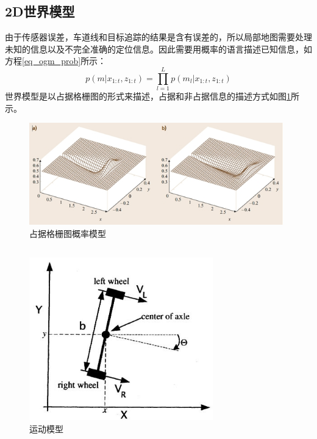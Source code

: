 \documentclass[12pt,a4paper]{article}
\newcommand{\zhiv}{\fontsize{12pt}{18pt}\selectfont}      %
\begin{document}
\subsection{\textbf{\zhiv 2D世界模型}}
由于传感器误差，车道线和目标追踪的结果是含有误差的，所以局部地图需要处理未知的信息以及不完全准确的定位信息。因此需要用概率的语言描述已知信息，如方程\ref{eq_ogm_prob}所示：
\begin{equation}
p(m|x_{1:t},z_{1:t})=\prod_{l=1}^L p(m_l|x_{1:t},z_{1:t})
\label{eq_ogm_prob}
\end{equation}
世界模型是以占据格栅图的形式来描述，占据和非占据信息的描述方式如图\ref{f_ogm_prob_model}所示\parencite{Elfes:1989:UOG:68491.68495}。
\begin{figure}[!htb]
  \centering
  \includegraphics[height=125pt]{occupancy_prob_model.jpg}
  \caption{占据格栅图概率模型\label{f_ogm_prob_model}}
\end{figure}

{\subsection{\textbf{\song\zhiv{运动模型}}}}
\begin{figure}[!htb]
	\centering
	\includegraphics[height=200pt]{motion_model.jpg}
	\caption{运动模型\label{f_motion_model}}
\end{figure}
\end{document}
